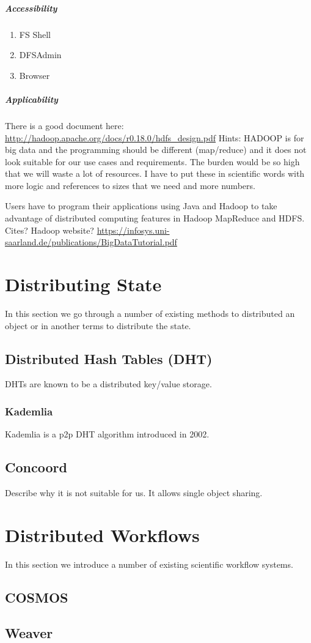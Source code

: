 \subparagraph{Accessibility}
\begin{enumerate}
\item FS Shell
\item DFSAdmin
\item Browser
\end{enumerate}

\subparagraph{Applicability}
There is a good document here:
\url{http://hadoop.apache.org/docs/r0.18.0/hdfs_design.pdf}
Hints: HADOOP is for big data and the programming should be different (map/reduce)
 and it does not look suitable for our use cases and requirements. The burden would
 be so high that we will waste a lot of resources. I have to put these in scientific
 words with more logic and references to sizes that we need and more numbers.

Users have to program their applications using Java and Hadoop to 
take advantage of distributed computing features in Hadoop MapReduce
and HDFS. Cites? Hadoop website?
\url{https://infosys.uni-saarland.de/publications/BigDataTutorial.pdf}

\section{Distributing State}
In this section we go through a number of existing methods to distributed an object or in another terms to distribute the state.

\subsection{Distributed Hash Tables (DHT)}
DHTs are known to be a distributed key/value storage.

\subsubsection{Kademlia}
Kademlia is a p2p DHT algorithm introduced in 2002.

\subsection{Concoord}
Describe why it is not suitable for us. It allows single object sharing.

\section{Distributed Workflows}
In this section we introduce a number of existing scientific workflow systems.
\subsection{COSMOS}\cite{Gafni30062014}
\subsection{Weaver}\cite{Bui_weaver:integrating}